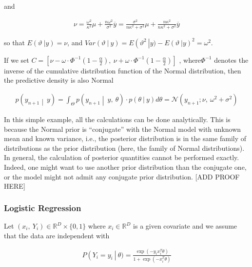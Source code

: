 and

\begin{align}\nu = \frac{\omega^{2}}{\kappa^{2}}\mu + \frac{n\omega^{2}}{\sigma^{2}}\overline{y} = \frac{\sigma^{2}}{n\kappa^{2} + \sigma^{2}}\mu + \frac{n\kappa^{2}}{n\kappa^{2} + \sigma^{2}}\overline{y}\end{align}

so that \(E(\vartheta\ |y) = \nu\), and
\(Var(\vartheta\ |\ y) = E\left( \vartheta^{2}\  \right|y) - {E(\vartheta\ |y)}^{2} = \omega^{2}\).

If we set
\(C = [\nu - \omega \cdot \Phi^{- 1}\left( 1 - \frac{\alpha}{2} \right),\ \nu + \omega \cdot \Phi^{- 1}\left( 1 - \frac{\alpha}{2} \right)]\)
, where\(\Phi^{- 1}\) denotes the inverse of the cumulative distribution
function of the Normal distribution, then the predictive density is also
Normal

\begin{align}p\left( y_{n + 1} \middle| \ y \right) = \int_{\Theta}^{}{p\left( y_{n + 1} \middle| \ y,\ \theta \right) \cdot p(\theta\ |\ y)}d\theta = \mathcal{N}\left( y_{n + 1};\nu,\ \omega^{2} + \sigma^{2} \right)\end{align}

In this simple example, all the calculations can be done analytically.
This is because the Normal prior is ``conjugate'' with the Normal model
with unknown mean and known variance, i.e., the posterior distribution
is in the same family of distributions as the prior distribution (here,
the family of Normal distributions). In general, the calculation of
posterior quantities cannot be performed exactly. Indeed, one might want
to use another prior distribution than the conjugate one, or the model
might not admit any conjugate prior distribution. {[}ADD PROOF HERE{]}

\subsubsection{Logistic Regression}\label{logistic-regression}

Let \(\left( x_{i},\ Y_{i} \right) \in \mathbb{R}^{D} \times \{ 0,1\}\)
where \(x_{i} \in \mathbb{R}^{D}\) is a given covariate and we assume
that the data are independent with

\begin{align}P\left( Y_{i} = y_{i}\  \right|\ \theta) = \frac{\exp\left( - y_{i}x_{i}^{T}\theta \right)}{1 + \exp\left( - x_{i}^{T}\theta \right)}\end{align}

